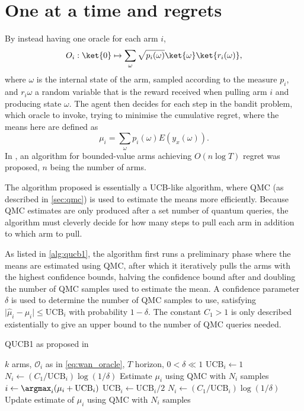 \section{One at a time and regrets}
By instead having one oracle for each arm $i$,
\begin{equation}
    O_i: \ket{0} \mapsto \sum_\omega \sqrt{p_i(\omega)} \ket{\omega} \ket{r_i(\omega)},
    \label{eq:wan_oracle}
\end{equation}
where $\omega$ is the internal state of the arm, sampled according to the measure $p_i$, and $r_i{\omega}$ a random variable that is the reward received when pulling arm $i$ and producing state $\omega$.
The agent then decides for each step in the bandit problem, which oracle to invoke, trying to minimise the cumulative regret, where the means here are defined as
\begin{equation}
    \mu_i = \sum_\omega p_i(\omega) E(y_x(\omega)).
\end{equation}
In \autocite{wan2022}, an algorithm for bounded-value arms achieving $O(n \log T)$ regret was proposed, $n$ being the number of arms.

The algorithm proposed is essentially a UCB-like algorithm, where QMC (as described in \cref{sec:qmc}) is used to estimate the means more efficiently.
Because QMC estimates are only produced after a set number of quantum queries, the algorithm must cleverly decide for how many steps to pull each arm in addition to which arm to pull.

As listed in \cref{alg:qucb1}, the algorithm first runs a preliminary phase where the means are estimated using QMC, after which it iteratively pulls the arms with the highest confidence bounds, halving the confidence bound after and doubling the number of QMC samples used to estimate the mean.
A confidence parameter $\delta$ is used to determine the number of QMC samples to use, satisfying $\lvert\hat{\mu}_i - \mu_i\rvert \leq \text{UCB}_i$ with probability $1-\delta$.
The constant $C_1>1$ is only described existentially to give an upper bound to the number of QMC queries needed.

\begin{algorithm}
    \caption{QUCB1 as proposed in \autocite{wan2022}}
    \label{alg:qucb1}
    \begin{algorithmic}[1]
        \Require $k$ arms, $\mathcal{O}_i$ as in \cref{eq:wan_oracle}, $T$ horizon, $0 < \delta \ll 1$
        \State $\text{UCB}_i \gets 1$
        \State $N_i \gets (C_1/\text{UCB}_i) \log(1/\delta)$
        \State Estimate $\mu_i$ using QMC with $N_i$ samples
        \EndFor
        \State $i \gets \argmax_i (\mu_i + \text{UCB}_i)$
        \State $\text{UCB}_i \gets \text{UCB}_i /2$
        \State $N_i \gets (C_1/\text{UCB}_i) \log(1/\delta)$
        \State Update estimate of $\mu_i$ using QMC with $N_i$ samples
        \EndWhile
    \end{algorithmic}
\end{algorithm}
